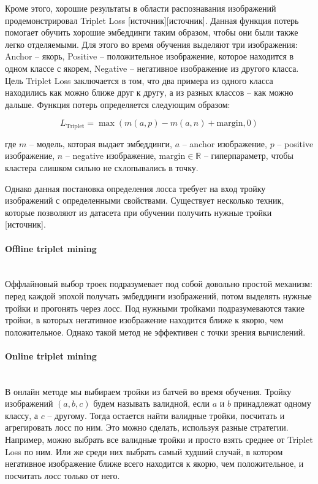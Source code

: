 Кроме этого, хорошие результаты в области распознавания изображений продемонстрировал Triplet Loss [источник][источник]. Данная функция потерь помогает обучить хорошие эмбеддинги таким образом, чтобы они были также легко отделяемыми. Для этого во время обучения выделяют три изображения: Anchor -- якорь, Positive -- положительное изображение, которое находится в одном классе с якорем, Negative -- негативное изображение из другого класса. Цель Triplet Loss заключается в том, что два примера из одного класса находились как можно ближе друг к другу, а из разных классов -- как можно дальше. Функция потерь определяется следующим образом:

$$
L_{\text{Triplet}} = \max(m(a, p) - m(a, n) + \text{margin}, 0)
$$

\noindent
где $m$ -- модель, которая выдает эмбеддинги, $a$ -- anchor изображение, $p$ -- positive изображение, $n$ -- negative изображение, $\text{margin} \in \mathbb{R}$ -- гиперпараметр, чтобы кластера слишком сильно не схлопывались в точку.

Однако данная постановка определения лосса требует на вход тройку изображений с определенными свойствами. Существует несколько техник, которые позволяют из датасета при обучении получить нужные тройки [источник].

\paragraph{Offline triplet mining}\mbox{} \\

Оффлайновый выбор троек подразумевает под собой довольно простой механизм: перед каждой эпохой получать эмбеддинги изображений, потом выделять нужные тройки и прогонять через лосс. Под нужными тройками подразумеваются такие тройки, в которых негативное изображение находится ближе к якорю, чем положительное. Однако такой метод не эффективен с точки зрения вычислений.

\paragraph{Online triplet mining}\mbox{} \\

В онлайн методе мы выбираем тройки из батчей во время обучения. Тройку изображений $(a, b, c)$ будем называть валидной, если $a$ и $b$ принадлежат одному классу, а $c$ -- другому. Тогда остается найти валидные тройки, посчитать и агрегировать лосс по ним. Это можно сделать, используя разные стратегии. Например, можно выбрать все валидные тройки и просто взять среднее от Triplet Loss по ним. Или же среди них выбрать самый худший случай, в котором негативное изображение ближе всего находится к якорю, чем положительное, и посчитать лосс только от него.

